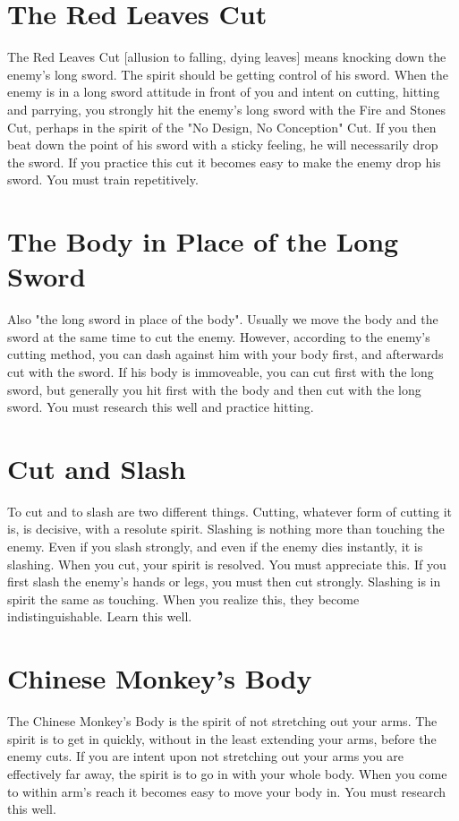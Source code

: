 \documentclass[12pt]{report}
\begin{document}
\section*{The Red Leaves Cut}
The Red Leaves Cut [allusion to falling, dying leaves] means knocking down the enemy's long sword. The spirit should be getting control of his sword. When the enemy is in a long sword attitude in front of you and intent on cutting, hitting and parrying, you strongly hit the enemy's long sword with the Fire and Stones Cut, perhaps in the spirit of the "No Design, No Conception" Cut. If you then beat down the point of his sword with a sticky feeling, he will necessarily drop the sword. If you practice this cut it becomes easy to make the enemy drop his sword. You must train repetitively.
\section*{The Body in Place of the Long Sword}
Also "the long sword in place of the body". Usually we move the body and the sword at the same time to cut the enemy. However, according to the enemy's cutting method, you can dash against him with your body first, and afterwards cut with the sword. If his body is immoveable, you can cut first with the long sword, but generally you hit first with the body and then cut with the long sword. You must research this well and practice hitting.
\section*{Cut and Slash}
To cut and to slash are two different things. Cutting, whatever form of cutting it is, is decisive, with a resolute spirit. Slashing is nothing more than touching the enemy. Even if you slash strongly, and even if the enemy dies instantly, it is slashing. When you cut, your spirit is resolved. You must appreciate this. If you first slash the enemy's hands or legs, you must then cut strongly. Slashing is in spirit the same as touching. When you realize this, they become indistinguishable. Learn this well.
\section*{Chinese Monkey's Body}
The Chinese Monkey's Body is the spirit of not stretching out your arms. The spirit is to get in quickly, without in the least extending your arms, before the enemy cuts. If you are intent upon not stretching out your arms you are effectively far away, the spirit is to go in with your whole body. When you come to within arm's reach it becomes easy to move your body in. You must research this well.
\end{document}
